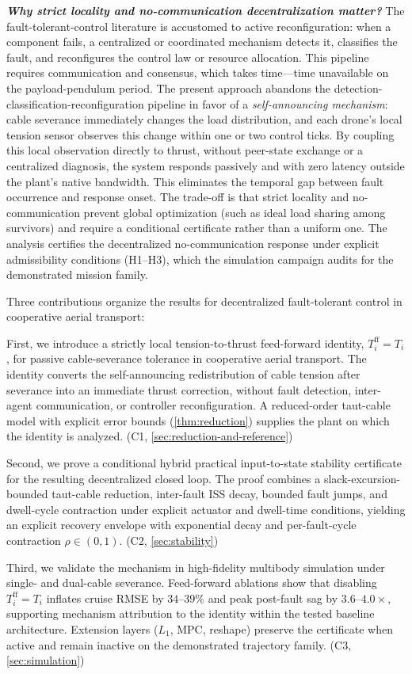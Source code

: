 \textbf{\textit{Why strict locality and no-communication decentralization matter?}} The fault-tolerant-control literature is accustomed to active reconfiguration: when a component fails, a centralized or coordinated mechanism detects it, classifies the fault, and reconfigures the control law or resource allocation. This pipeline requires communication and consensus, which takes time—time unavailable on the payload-pendulum period. The present approach abandons the detection-classification-reconfiguration pipeline in favor of a \emph{self-announcing mechanism}: cable severance immediately changes the load distribution, and each drone's local tension sensor observes this change within one or two control ticks. By coupling this local observation directly to thrust, without peer-state exchange or a centralized diagnosis, the system responds passively and with zero latency outside the plant's native bandwidth. This eliminates the temporal gap between fault occurrence and response onset. The trade-off is that strict locality and no-communication prevent global optimization (such as ideal load sharing among survivors) and require a conditional certificate rather than a uniform one. The analysis certifies the decentralized no-communication response under explicit admissibility conditions (H1–H3), which the simulation campaign audits for the demonstrated mission family.


Three contributions organize the results for decentralized fault-tolerant control in cooperative aerial transport:

First, we introduce a strictly local tension-to-thrust feed-forward identity, $T_i^{\mathrm{ff}} = T_i$, for passive cable-severance tolerance in cooperative aerial transport. The identity converts the self-announcing redistribution of cable tension after severance into an immediate thrust correction, without fault detection, inter-agent communication, or controller reconfiguration. A reduced-order taut-cable model with explicit error bounds (\cref{thm:reduction}) supplies the plant on which the identity is analyzed. (C1, \cref{sec:reduction-and-reference})

Second, we prove a conditional hybrid practical input-to-state stability certificate for the resulting decentralized closed loop. The proof combines a slack-excursion-bounded taut-cable reduction, inter-fault ISS decay, bounded fault jumps, and dwell-cycle contraction under explicit actuator and dwell-time conditions, yielding an explicit recovery envelope with exponential decay and per-fault-cycle contraction $\rho \in (0,1)$. (C2, \cref{sec:stability})

Third, we validate the mechanism in high-fidelity multibody simulation under single- and dual-cable severance. Feed-forward ablations show that disabling $T_i^{\mathrm{ff}} = T_i$ inflates cruise RMSE by $34$--$39\%$ and peak post-fault sag by $3.6$--$4.0\times$, supporting mechanism attribution to the identity within the tested baseline architecture. Extension layers ($L_1$, MPC, reshape) preserve the certificate when active and remain inactive on the demonstrated trajectory family. (C3, \cref{sec:simulation})